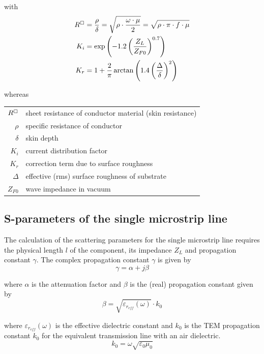 \documentclass[10pt]{report}
\begin{document}
with
\begin{align}
R^{\boxempty} &= \dfrac{\rho}{\delta} = \sqrt{\rho\cdot\dfrac{\omega \cdot \mu}{2}} = \sqrt{\rho\cdot\pi\cdot f \cdot \mu}\\
\label{eq:HandJKi}
K_i &= \exp{\left(-1.2\left(\dfrac{Z_L}{Z_{F0}}\right)^{0.7}\right)}\\
K_r &= 1 + \dfrac{2}{\pi}\arctan{\left(1.4\left(\dfrac{\Delta}{\delta}\right)^2\right)}
\end{align}

whereas

\addvspace{12pt}

\begin{tabular}{rl}
$R^{\boxempty}$& sheet resistance of conductor material (skin resistance)\\
$\rho$& specific resistance of conductor\\
$\delta$& skin depth\\
$K_i$& current distribution factor\\
$K_r$& correction term due to surface roughness\\
$\Delta$& effective (rms) surface roughness of substrate\\
$Z_{F0}$& wave impedance in vacuum
\end{tabular}

\subsection{S-parameters of the single microstrip line}

The calculation of the scattering parameters for the single microstrip
line requires the physical length $l$ of the component, its impedance
$Z_L$ and propagation constant $\gamma$.  The complex propagation
constant $\gamma$ is given by
\begin{equation}
\gamma = \alpha + j\beta
\end{equation}

where $\alpha$ is the attenuation factor and $\beta$ is the (real)
propagation constant given by
\begin{equation}
\beta = \sqrt{\varepsilon_{r_{eff}}(\omega)} \cdot k_0
\end{equation}

where $\varepsilon_{r_{eff}}(\omega)$ is the effective dielectric
constant and $k_0$ is the TEM propagation constant $k_0$ for the
equivalent transmission line with an air dielectric.
\begin{equation}
k_0 = \omega \sqrt{\varepsilon_0 \mu_0}
\end{equation}
\end{document}
